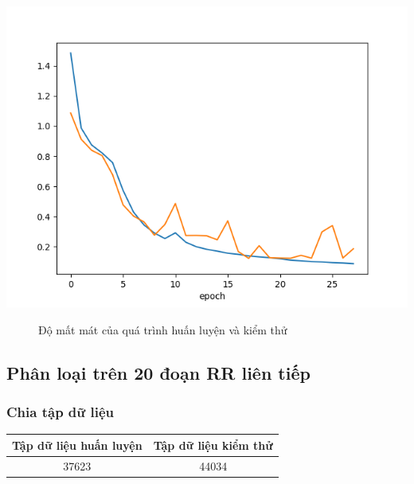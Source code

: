 \begin{center}
    \includegraphics[scale=.6]{image/chapter6/loss.png}
    \begin{figure}[htp]
    \begin{center}
    \end{center}
    \caption{Độ mất mát của quá trình huấn luyện và kiểm thử}
    \end{figure}
\end{center}

\subsection{Phân loại trên 20 đoạn RR liên tiếp}
\subsubsection{Chia tập dữ liệu}
\begin{center}
    \begin{tabular}{|c|c|}
    \hline 
    Tập dữ liệu huấn luyện & Tập dữ liệu kiểm thử \\ 
    \hline 
    37623 & 44034\\
    \hline 
    \end{tabular}
\end{center}
